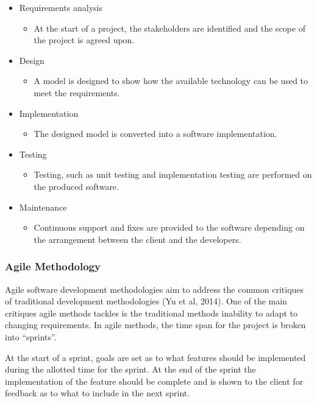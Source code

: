 \documentclass[12pt,a4paper]{article}
\begin{document}
\begin{itemize}
    \item Requirements analysis
    \begin{itemize}
        \item At the start of a project, the stakeholders are identified and the scope of the project is agreed upon.
    \end{itemize}
    \item Design
    \begin{itemize}
        \item A model is designed to show how the available technology can be used to meet the requirements.
    \end{itemize}
    \item Implementation
    \begin{itemize}
        \item The designed model is converted into a software implementation.
    \end{itemize}
    \item Testing
    \begin{itemize}
        \item Testing, such as unit testing and implementation testing are performed on the produced software.
    \end{itemize}
    \item Maintenance
    \begin{itemize}
        \item Continuous support and fixes are provided to the software depending on the arrangement between the client and the developers.
    \end{itemize}
\end{itemize}

\subsubsection{Agile Methodology}

Agile software development methodologies aim to address the common critiques of traditional development methodologies (Yu et al, 2014). One of the main critiques agile methods tackles is the traditional methods inability to adapt to changing requirements. In agile methods, the time span for the project is broken into ``sprints''.

At the start of a sprint, goals are set as to what features should be implemented during the allotted time for the sprint. At the end of the sprint the implementation of the feature should be complete and is shown to the client for feedback as to what to include in the next sprint.
\end{document}
